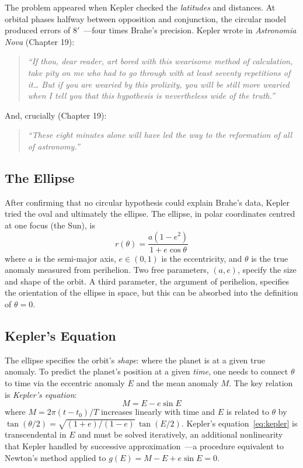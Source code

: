 \documentclass[12pt]{article}
\begin{document}
The problem appeared when Kepler checked the \emph{latitudes} and distances.
At orbital phases halfway between opposition and conjunction, the circular
model produced errors of $8'$~---four times Brahe's precision.
Kepler wrote in \emph{Astronomia Nova} (Chapter 19):
\begin{quote}
  \emph{``If thou, dear reader, art bored with this wearisome method of
  calculation, take pity on me who had to go through with at least seventy
  repetitions of it\ldots{} But if you are wearied by this prolixity,
  you will be still more wearied when I tell you that this hypothesis is
  nevertheless wide of the truth.''}
\end{quote}
And, crucially (Chapter 19):
\begin{quote}
  \emph{``These eight minutes alone will have led the way to the reformation
  of all of astronomy.''}
\end{quote}

\subsection{The Ellipse}

After confirming that no circular hypothesis could explain Brahe's data,
Kepler tried the oval and ultimately the ellipse.
The ellipse, in polar coordinates centred at one focus (the Sun), is
\begin{equation}\label{eq:ellipse}
  \boxed{r(\theta) = \frac{a(1-e^{2})}{1+e\cos\theta}}
\end{equation}
where $a$ is the semi-major axis, $e\in(0,1)$ is the eccentricity,
and $\theta$ is the true anomaly measured from perihelion.
Two free parameters, $(a,e)$, specify the size and shape of the orbit.
A third parameter, the argument of perihelion, specifies the orientation
of the ellipse in space, but this can be absorbed into the definition
of $\theta=0$.

\subsection{Kepler's Equation}

The ellipse specifies the orbit's \emph{shape}: where the planet is at a
given true anomaly.  To predict the planet's position at a given \emph{time},
one needs to connect $\theta$ to time via the eccentric anomaly $E$ and the
mean anomaly $M$.  The key relation is \emph{Kepler's equation}:
\begin{equation}\label{eq:kepler}
  \boxed{M = E - e\sin E}
\end{equation}
where $M = 2\pi(t-t_{0})/T$ increases linearly with time and $E$ is
related to $\theta$ by $\tan(\theta/2)=\sqrt{(1+e)/(1-e)}\,\tan(E/2)$.
Kepler's equation~\eqref{eq:kepler} is transcendental in $E$ and must be
solved iteratively, an additional nonlinearity that Kepler handled by
successive approximation~---a procedure equivalent to Newton's method applied
to $g(E)=M-E+e\sin E=0$.
\end{document}
